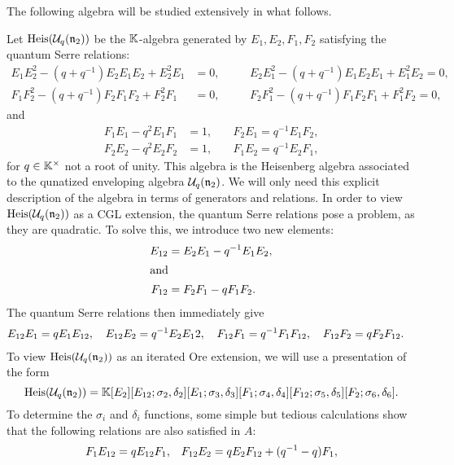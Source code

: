 The following algebra will be studied extensively in what follows.
\begin{example}\label{exmp:heisenberg}
	Let $\operatorname{Heis}(\mathcal{U}_q(\mathfrak{n}_2))$ be the $\mathbb{K}$-algebra generated by $E_1, E_2, F_1, F_2$ satisfying the quantum Serre relations:
	\begin{align*}
		E_1 E_2^2 - (q + q^{-1}) E_2 E_1 E_2 + E_2^2 E_1 & = 0,\quad &  & E_2 E_1^2 - (q + q^{-1}) E_1 E_2 E_1 + E_1^2 E_2 = 0, \\
		F_1 F_2^2 - (q + q^{-1}) F_2 F_1 F_2 + F_2^2 F_1 & = 0,\quad &  & F_2 F_1^2 - (q + q^{-1}) F_1 F_2 F_1 + F_1^2 F_2 = 0,
	\end{align*}
	and
	\begin{align*}
		F_1 E_1 - q^2 E_1 F_1 & = 1, \quad & F_2 E_1 = q^{-1}E_1 F_2, \\
		F_2 E_2 - q^2 E_2 F_2 & = 1, \quad & F_1 E_2 = q^{-1}E_2 F_1,
	\end{align*}
	for $q \in \mathbb{K}^\times$ not a root of unity. This algebra is the Heisenberg algebra associated to the qunatized enveloping algebra $\mathcal{U}_q(\mathfrak{n}_2)$. We will only need this explicit description of the algebra in terms of generators and relations. In order to view $\operatorname{Heis}(\mathcal{U}_q(\mathfrak{n}_2))$ as a CGL extension, the quantum Serre relations pose a problem, as
	they are quadratic. To solve this, we introduce two new elements:
	\begin{align*}
		E_{12} & = E_2 E_1 - q^{-1}E_1 E_2, \\
		\shortintertext{and}
		F_{12} & = F_2 F_1 - qF_1 F_2.
	\end{align*}
	The quantum Serre relations then immediately give
	\begin{align*}
		E_{12}E_1 & = q E_1 E_{12}, \quad E_{12}E_2 = q^{-1} E_2 E_12, \quad F_{12}F_1 = q^{-1} F_1 F_{12}, \quad F_{12}F_2 = q F_2 F_{12}.
	\end{align*}
	To view $\operatorname{Heis}(\mathcal{U}_q(\mathfrak{n}_2))$ as an iterated Ore extension, we will use a presentation of the form
	\begin{equation}\label{eq:cgl_heisenberg}
		\operatorname{Heis}(\mathcal{U}_q(\mathfrak{n}_2)) = \mathbb{K}[E_2][E_{12}; \sigma_2, \delta_2][E_1;\sigma_3, \delta_3][F_1; \sigma_4, \delta_4][F_{12}; \sigma_5, \delta_5][F_2; \sigma_6, \delta_6].
	\end{equation}
	To determine the $\sigma_i$ and $\delta_i$ functions, some simple but tedious
	calculations show that the following relations are also satisfied in $A$:
	\begin{align*}
		F_1 E_{12}   & = q E_{12} F_1,                                        &  & F_{12}E_2 = q E_2 F_{12} + (q\inv - q) F_1, \\

\end{align*}
\end{example}
